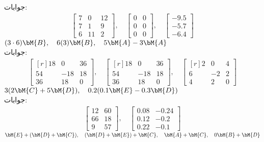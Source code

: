 جوابات:
\begin{align*}
\begin{bmatrix*}
7&0&12\\
7&1&9\\
6&11&2
\end{bmatrix*}, \quad 
\begin{bmatrix*}
0&0\\
0&0\\
0&0
\end{bmatrix*}, \quad 
\begin{bmatrix*}
-9.5\\
-5.7\\
-6.4
\end{bmatrix*}
\end{align*}
\quad
$(3\cdot 6)\bM{B},\quad 6(3)\bM{B},\quad 5\bM{A}-3\bM{A}$\\
جوابات:
\begin{align*}
\begin{bmatrix*}[r]
18&0&36\\
54&-18&18\\
36&18&0
\end{bmatrix*}, \quad 
\begin{bmatrix*}[r]
18&0&36\\
54&-18&18\\
36&18&0
\end{bmatrix*},\quad
\begin{bmatrix*}[r]
2&0&4\\
6&-2&2\\
4&2&0
\end{bmatrix*}
\end{align*}
\quad
$3(2\bM{C}+5\bM{D}),\quad 0.2(0.1\bM{E}-0.3\bM{D})$\\
جوابات:
\begin{align*}
\begin{bmatrix*}
12&60\\
66&18\\
9&57
\end{bmatrix*},\quad
\begin{bmatrix*}
0.08&-0.24\\
0.12&-0.2\\
0.22&-0.1
\end{bmatrix*}
\end{align*}
\quad
$\bM{E}+(\bM{D}+\bM{C}),\quad (\bM{D}+\bM{E})+\bM{C},\quad \bM{A}+\bM{C},\quad 0\bM{B}+\bM{D}$\\
